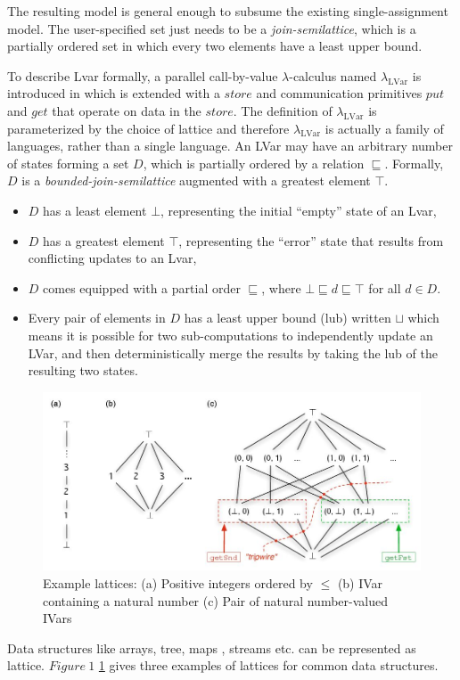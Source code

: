 \documentclass[twocolumn]{article}
\newcommand{\lambdaLVar}{\ensuremath{\lambda_{\textrm{LVar}}}}
\newcommand{\userleq}{\ensuremath{\sqsubseteq}}
\begin{document}
The resulting model is general enough to subsume the existing single-assignment model. The user-specified set just needs to be a \textit{join-semilattice}, which is a partially ordered set in which every two elements have a least upper bound. 

To describe Lvar formally, a parallel call-by-value $\lambda$-calculus named $\lambdaLVar$ is introduced in \cite{lkuper} which is extended with a $store$ and communication primitives $put$ and $get$ that operate on data in the $store$. The definition of $\lambdaLVar$ is parameterized by the choice of lattice and therefore $\lambdaLVar$ is actually a family of languages, rather than a single language. An LVar may have an arbitrary number of states forming a set $D$, which is partially ordered by a relation $\userleq$. Formally, $D$ is a \emph{bounded-join-semilattice} augmented with a greatest element $\top$. 
\begin{itemize}
\item $D$ has a least element $\bot$, representing the initial “empty” state of an Lvar,
\item $D$ has a greatest element $\top$, representing the “error” state that results from conflicting updates to an Lvar,
\item $D$ comes equipped with a partial order $\userleq$, where $\bot \userleq d \userleq \top$ for all $d \in D$.
\item Every pair of elements in $D$ has a least upper bound (lub) written $\sqcup$ which means it is possible for two sub-computations to independently update an LVar, and then deterministically merge the results by taking the lub of the resulting two states.
\end{itemize}
\begin{figure}
\centerline{
\includegraphics[width=1.0\columnwidth]{Figures/lattice.jpg}
}
\caption{Example lattices\cite{lkuper}: (a) Positive integers ordered by $\leq$ (b) IVar containing a natural number (c) Pair of natural number-valued IVars}
\label{Figure1}
\end{figure}
Data structures like arrays, tree, maps , streams etc. can be represented  as lattice. $Figure\ 1$ \ref{Figure1} gives three examples of lattices for common data structures.
 
\end{document}
